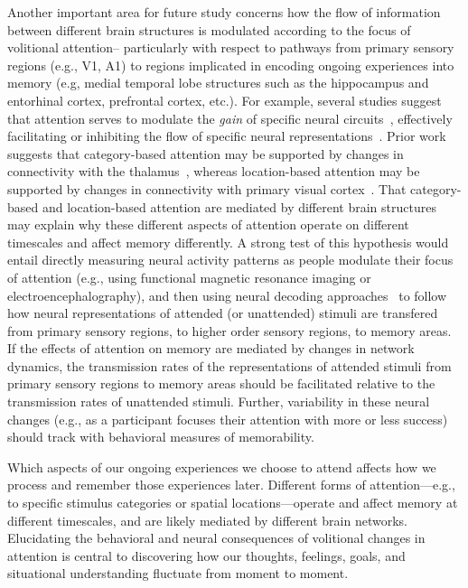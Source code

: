 \documentclass[english]{article}
\begin{document}
Another important area for future study concerns how the flow of information
between different brain structures is modulated according to the focus of
volitional attention-- particularly with respect to pathways from primary
sensory regions (e.g., V1, A1) to regions implicated in encoding ongoing
experiences into memory (e.g, medial temporal lobe structures such as the
hippocampus and entorhinal cortex, prefrontal cortex, etc.). For example,
several studies suggest that attention serves to modulate the \textit{gain} of
specific neural circuits~\citep{TreuTruj99, ChanEtal02, EldaEtal13,
SaliThie00}, effectively facilitating or inhibiting the flow of specific neural
representations~\citep{VartEtal07, LaRoEtal14}. Prior work suggests that
category-based attention may be supported by changes in connectivity with the
thalamus~\citep{Schn11}, whereas location-based attention may be supported by
changes in connectivity with primary visual cortex~\citep{NoudEtal10}. That
category-based and location-based attention are mediated by different brain
structures~\citep[e.g.,][ and others]{GiesEtal03} may explain why these
different aspects of attention operate on different timescales and affect
memory differently. A strong test of this hypothesis would entail directly
measuring neural activity patterns as people modulate their focus of attention
(e.g., using functional magnetic resonance imaging or electroencephalography),
and then using neural decoding approaches~\citep[e.g.,][]{HaxbEtal01,
NormEtal06b, MannEtal18, OwenEtal21} to follow how neural representations of
attended (or unattended) stimuli are transfered from primary sensory regions,
to higher order sensory regions, to memory areas. If the effects of attention
on memory are mediated by changes in network dynamics, the transmission rates
of the representations of attended stimuli from primary sensory regions to
memory areas should be facilitated relative to the transmission rates of
unattended stimuli. Further, variability in these neural changes (e.g., as a
participant focuses their attention with more or less success) should track
with behavioral measures of memorability.

Which aspects of our ongoing experiences we choose to attend affects how we
process and remember those experiences later. Different forms of
attention---e.g., to specific stimulus categories or spatial
locations---operate and affect memory at different timescales, and are likely
mediated by different brain networks. Elucidating the behavioral and neural
consequences of volitional changes in attention is central to discovering how
our thoughts, feelings, goals, and situational understanding fluctuate from
moment to moment.
\end{document}

